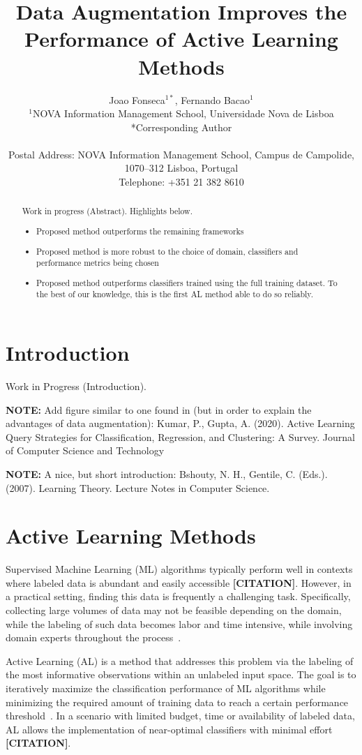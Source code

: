 \documentclass[parskip=full]{scrartcl}
\date{}
\title{%
    Data Augmentation Improves the Performance of Active Learning Methods
}
\author{%
	Joao Fonseca\(^{1*}\), Fernando Bacao\(^{1}\)
	\\
	\small{\(^{1}\)NOVA Information Management School, Universidade Nova de Lisboa}
	\\
	\small{*Corresponding Author}
	\\
	\\
	\small{Postal Address: NOVA Information Management School, Campus de
    Campolide, 1070--312 Lisboa, Portugal}
	\\
	\small{Telephone: +351 21 382 8610}
}
\begin{document}
\maketitle

\begin{abstract}
    Work in progress (Abstract). Highlights below.
    \begin{itemize}
        \item Proposed method outperforms the remaining frameworks
        \item Proposed method is more robust to the choice of domain, classifiers
            and performance metrics being chosen
        \item Proposed method outperforms classifiers trained using the full
            training dataset. To the best of our knowledge, this is the first
            AL method able to do so reliably.
    \end{itemize}
\end{abstract}

\section{Introduction}

Work in Progress (Introduction).

\textbf{NOTE:} Add figure similar to one found in (but in order to explain the
advantages of data augmentation): Kumar, P., Gupta, A. (2020). Active Learning
Query Strategies for Classification, Regression, and Clustering: A Survey.
Journal of Computer Science and Technology

\textbf{NOTE:} A nice, but short introduction: Bshouty, N. H., Gentile, C.
(Eds.). (2007). Learning Theory. Lecture Notes in Computer Science\@.

\section{Active Learning Methods}

Supervised Machine Learning (ML) algorithms typically perform well in contexts
where labeled data is abundant and easily accessible \textbf{[CITATION]}.
However, in a practical setting, finding this data is frequently a challenging
task. Specifically, collecting large volumes of data may not be feasible
depending on the domain, while the labeling of such data becomes labor and
time intensive, while involving domain experts throughout the
process~\cite{Cao2020}.

Active Learning (AL) is a method that addresses this problem via the labeling
of the most informative observations within an unlabeled input space. The goal
is to iteratively maximize the classification performance of ML algorithms
while minimizing the required amount of training data to reach a certain
performance threshold~\cite{Shrivastava2021}. In a scenario with limited
budget, time or availability of labeled data, AL allows the implementation of
near-optimal classifiers with minimal effort \textbf{[CITATION]}.
\end{document}

